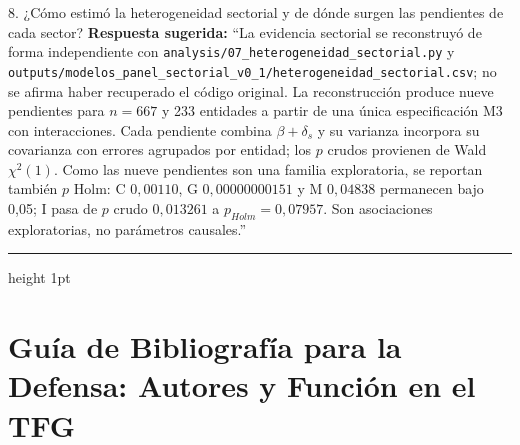 \documentclass[11pt,a4paper]{article}
\begin{document}
\vspace{0.2cm}

\begin{qbox}{8. ¿Cómo estimó la heterogeneidad sectorial y de dónde surgen las pendientes de cada sector?}
\textbf{Respuesta sugerida:}  
``La evidencia sectorial se reconstruyó de forma independiente con \texttt{analysis/07\_heterogeneidad\_sectorial.py} y \texttt{outputs/modelos\_panel\_sectorial\_v0\_1/heterogeneidad\_sectorial.csv}; no se afirma haber recuperado el código original. La reconstrucción produce nueve pendientes para $n=667$ y 233 entidades a partir de una única especificación M3 con interacciones. Cada pendiente combina $\beta+\delta_s$ y su varianza incorpora su covarianza con errores agrupados por entidad; los $p$ crudos provienen de Wald $\chi^2(1)$. Como las nueve pendientes son una familia exploratoria, se reportan también $p$ Holm: C $0{,}00110$, G $0{,}00000000151$ y M $0{,}04838$ permanecen bajo 0,05; I pasa de $p$ crudo $0{,}013261$ a $p_{Holm}=0{,}07957$. Son asociaciones exploratorias, no parámetros causales.''
\end{qbox}

\vspace{0.6cm}
\hrule height 1pt
\vspace{0.6cm}

\section*{Guía de Bibliografía para la Defensa: Autores y Función en el TFG}
\end{document}
